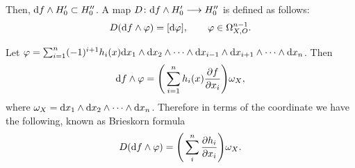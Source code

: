 \documentclass[pdftex]{sigma}%
\numberwithin{equation}{section}
\begin{document}
Then, ${\rm d}f\wedge H_{0}^{\prime} \subset H_{0}^{\prime\prime}$.
A map $D\colon {\rm d}f\wedge H_{0}^{\prime} \longrightarrow H_{0}^{\prime\prime} $ is defined as follows:
\begin{gather*}
D({\rm d}f\wedge \varphi) = [{\rm d}\varphi], \qquad \varphi \in \Omega_{X,O}^{n-1}.
\end{gather*}

Let $ \varphi= \sum_{i=1}^{n} (-1)^{i+1}h_i(x){\rm d}x_1 \wedge {\rm d}x_2 \wedge \cdots \wedge {\rm d}x_{i-1} \wedge {\rm d}x_{i+1} \wedge \cdots \wedge {\rm d}x_n$. Then
\begin{gather*}
{\rm d}f\wedge \varphi = \Bigg(\sum_{i=1}^{n} h_i(x)\frac{\partial f}{\partial x_i}\Bigg) \omega_X,
\end{gather*}
where $ \omega_X={\rm d}x_1\wedge {\rm d}x_2 \wedge \cdots \wedge {\rm d}x_n$. Therefore in terms of the coordinate we have the following, known as Brieskorn formula
\begin{gather*}
D({\rm d}f\wedge \varphi) = \Bigg(\sum_{i}^{n} \frac{\partial h_i}{\partial x_i}\Bigg)\omega_X.
\end{gather*}
\end{document}
